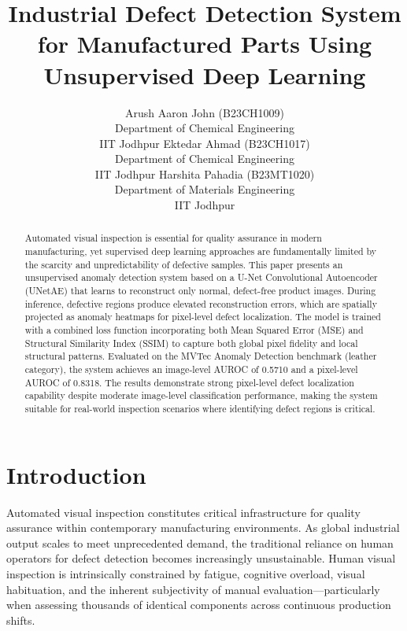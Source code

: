 \documentclass{article}
\title{Industrial Defect Detection System for Manufactured Parts Using Unsupervised Deep Learning}
\author{
  Arush Aaron John (B23CH1009) \\
  Department of Chemical Engineering \\
  IIT Jodhpur
  \And
  Ektedar Ahmad (B23CH1017) \\
  Department of Chemical Engineering \\
  IIT Jodhpur
  \And
  Harshita Pahadia (B23MT1020) \\
  Department of Materials Engineering \\
  IIT Jodhpur
}
\begin{document}
\maketitle

\begin{abstract}
Automated visual inspection is essential for quality assurance in modern manufacturing, yet supervised deep learning approaches are fundamentally limited by the scarcity and unpredictability of defective samples. This paper presents an unsupervised anomaly detection system based on a U-Net Convolutional Autoencoder (UNetAE) that learns to reconstruct only normal, defect-free product images. During inference, defective regions produce elevated reconstruction errors, which are spatially projected as anomaly heatmaps for pixel-level defect localization. The model is trained with a combined loss function incorporating both Mean Squared Error (MSE) and Structural Similarity Index (SSIM) to capture both global pixel fidelity and local structural patterns. Evaluated on the MVTec Anomaly Detection benchmark (leather category), the system achieves an image-level AUROC of 0.5710 and a pixel-level AUROC of 0.8318. The results demonstrate strong pixel-level defect localization capability despite moderate image-level classification performance, making the system suitable for real-world inspection scenarios where identifying defect regions is critical.
\end{abstract}

\section{Introduction}

Automated visual inspection constitutes critical infrastructure for quality assurance within contemporary manufacturing environments. As global industrial output scales to meet unprecedented demand, the traditional reliance on human operators for defect detection becomes increasingly unsustainable. Human visual inspection is intrinsically constrained by fatigue, cognitive overload, visual habituation, and the inherent subjectivity of manual evaluation---particularly when assessing thousands of identical components across continuous production shifts.
\end{document}
